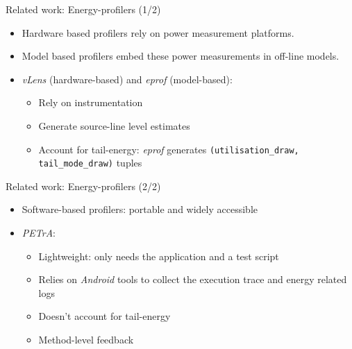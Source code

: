 %
%
\begin{frame}{Related work: Energy-profilers (1/2)}
\begin{itemize}
\item \alert{Hardware based} profilers rely on power measurement platforms.
\item \alert{Model based} profilers embed these power measurements in off-line models.
\item \textit{vLens} (hardware-based) and \textit{eprof} (model-based):
\begin{itemize}
\item Rely on instrumentation
\item Generate \alert{source-line level estimates}
\item Account for \alert{tail-energy}: \textit{eprof} generates \texttt{(utilisation\_draw, 
tail\_mode\_draw)} tuples
\end{itemize}
\end{itemize}
\end{frame}
%
\begin{frame}{Related work: Energy-profilers (2/2)}
\begin{itemize}
\item \alert{Software-based} profilers: portable and widely accessible
\item \textit{PETrA}:
\begin{itemize}
\item Lightweight: only needs the application and a test script
\item \alert{Relies on \textit{Android}} tools to collect the execution trace and energy related logs
\item Doesn't account for tail-energy
\item \alert{Method-level} feedback
\end{itemize}
\end{itemize}
\end{frame}
